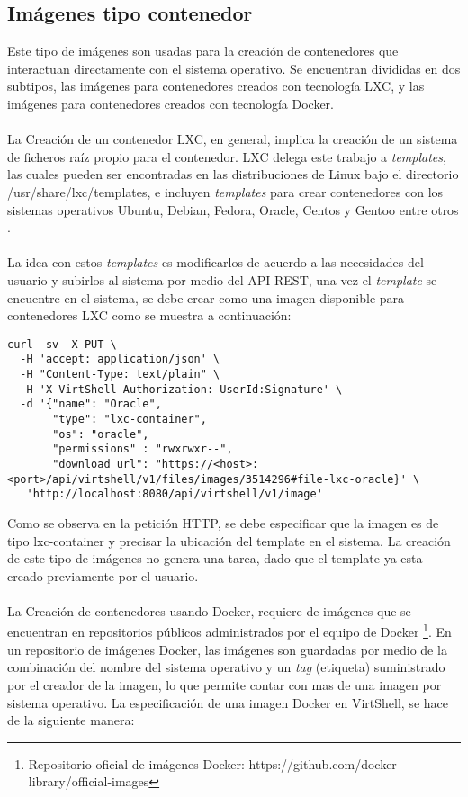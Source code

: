\subsection{Imágenes tipo contenedor}
Este tipo de imágenes son usadas para la creación de contenedores que interactuan directamente con el sistema operativo. Se encuentran divididas en dos subtipos, las imágenes para contenedores creados con tecnología LXC, y las imágenes para contenedores creados con tecnología Docker.\\
\\
La Creación de un contenedor LXC, en general, implica la creación de un sistema de ficheros raíz propio para el contenedor. LXC delega este trabajo a \emph{templates}, las cuales pueden ser encontradas en las distribuciones de Linux bajo el directorio /usr/share/lxc/templates, e incluyen \emph{templates} para crear contenedores con los sistemas operativos Ubuntu, Debian, Fedora, Oracle, Centos y Gentoo entre otros \cite{lxcubuntu16}. \\
\\
La idea con estos \emph{templates} es modificarlos de acuerdo a las necesidades del usuario y subirlos al sistema por medio del API REST,  una vez el \emph{template} se encuentre en el sistema, se debe crear como una imagen disponible para contenedores LXC como se muestra a continuación:

\vspace{3.5cm}

\begin{lstlisting}[style=json, caption=Petición HTTP para crear una imagen para contenedores LXC]
curl -sv -X PUT \
  -H 'accept: application/json' \
  -H "Content-Type: text/plain" \
  -H 'X-VirtShell-Authorization: UserId:Signature' \
  -d '{"name": "Oracle",
       "type": "lxc-container",
       "os": "oracle",
       "permissions" : "rwxrwxr--",
       "download_url": "https://<host>:<port>/api/virtshell/v1/files/images/3514296#file-lxc-oracle}' \
   'http://localhost:8080/api/virtshell/v1/image'
\end{lstlisting}

\vspace{5mm}

Como se observa en la petición HTTP, se debe especificar que la imagen es de tipo lxc-container y precisar la ubicación del template en el sistema. La creación de este tipo de imágenes no genera una tarea, dado que el template ya esta creado previamente por el usuario.\\
\\
La Creación de contenedores usando Docker, requiere de imágenes que se encuentran en repositorios públicos administrados por el equipo de Docker \footnote{Repositorio oficial de imágenes Docker: https://github.com/docker-library/official-images}. En un repositorio de imágenes Docker, las imágenes son guardadas por medio de la combinación del nombre del sistema operativo y un \emph{tag} (etiqueta) suministrado por el creador de la imagen, lo que permite contar con mas de una imagen por sistema operativo. La especificación de una imagen Docker en VirtShell, se hace de la siguiente manera:

